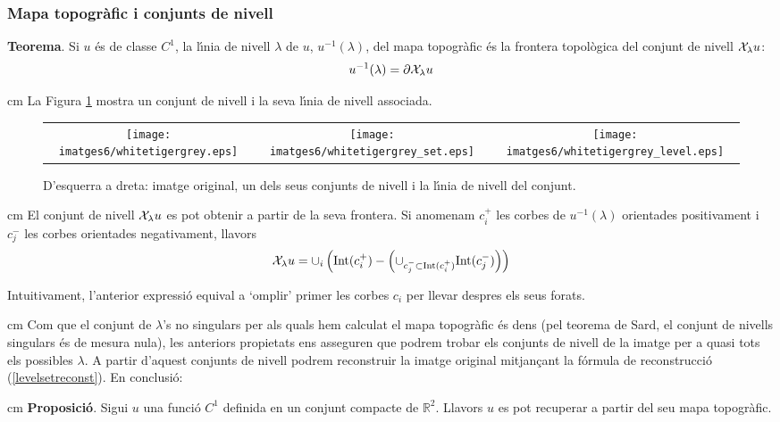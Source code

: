 \documentclass{article}
\def\R{\mathbb R}
\begin{document}
\subsubsection{Mapa topogr\`afic i conjunts de nivell}

{\bf Teorema}. Si $u$ \'es de classe $C^1$, la l\'\i nia de nivell $\lambda$ de $u$, $u^{-1}(\lambda)$, 
del mapa topogr\`afic \'es la frontera topol\`ogica del conjunt de nivell ${\cal X}_\lambda u$:
\[
u^{-1}(\lambda)=\partial {\cal X}_\lambda u
\]

 cm
La Figura \ref{ex_levellines} mostra un conjunt de nivell i la seva l\'\i nia de nivell associada.

\begin{figure}[htbp]
\begin{center}
\begin{tabular}{ccc}
\texttt{[image: imatges6/whitetigergrey.eps]} & 
\texttt{[image: imatges6/whitetigergrey\_set.eps]} &
\texttt{[image: imatges6/whitetigergrey\_level.eps]}
\end{tabular}
\end{center}
\caption{D'esquerra a dreta: imatge original, un dels seus conjunts de nivell i la l\'\i nia de nivell del
conjunt.}
\label{ex_levellines}
\end{figure}


 cm
El conjunt de nivell ${\cal X}_\lambda u$ es pot obtenir a partir de la seva frontera. Si anomenam 
$c_i^+$ les corbes de $u^{-1}(\lambda)$ orientades positivament i $c_{j}^-$ les corbes 
orientades negativament, llavors
\[
{\cal X}_\lambda u=\cup_i \left( \text{Int}(c_i^+) - 
\left( \cup_{c_j^- \subset \text{Int}(c_i^+)} \text{Int}(c_j^-) \right) \right)
\]

Intuitivament, l'anterior expressi\'o equival a `omplir' primer les corbes $c_i$ per llevar despres els seus 
forats.

 cm
Com que el conjunt de $\lambda$'s no singulars per als quals hem calculat el mapa topogr\`afic \'es
dens (pel teorema de Sard, el conjunt de nivells singulars \'es de mesura nula), 
les anteriors propietats ens asseguren que podrem trobar els conjunts de nivell de la imatge per a quasi
tots els possibles $\lambda$. A partir d'aquest conjunts de nivell podrem reconstruir la imatge original
mitjan\c{c}ant la f\'ormula de reconstrucci\'o (\ref{levelsetreconst}). En conclusi\'o:

 cm
\noindent
{\bf Proposici\'o}. Sigui $u$ una funci\'o $C^1$ definida en un conjunt compacte de $\R^2$. Llavors $u$
es pot recuperar a partir del seu mapa topogr\`afic.
\end{document}

